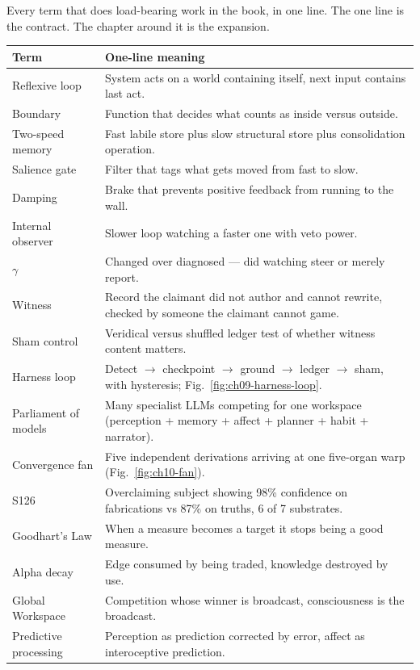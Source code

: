 Every term that does load-bearing work in the book, in one line. The one line is the contract. The chapter around it is the expansion.

\begin{center}
\small
\begin{tabular}{p{3.6cm}p{8.8cm}}
\toprule
Term & One-line meaning \\
\midrule
Reflexive loop & System acts on a world containing itself, next input contains last act. \\
Boundary & Function that decides what counts as inside versus outside. \\
Two-speed memory & Fast labile store plus slow structural store plus consolidation operation. \\
Salience gate & Filter that tags what gets moved from fast to slow. \\
Damping & Brake that prevents positive feedback from running to the wall. \\
Internal observer & Slower loop watching a faster one with veto power. \\
$\gamma$ & Changed over diagnosed --- did watching steer or merely report. \\
Witness & Record the claimant did not author and cannot rewrite, checked by someone the claimant cannot game. \\
Sham control & Veridical versus shuffled ledger test of whether witness content matters. \\
Harness loop & Detect $\to$ checkpoint $\to$ ground $\to$ ledger $\to$ sham, with hysteresis; Fig.~\ref{fig:ch09-harness-loop}. \\
Parliament of models & Many specialist LLMs competing for one workspace (perception + memory + affect + planner + habit + narrator). \\
Convergence fan & Five independent derivations arriving at one five-organ warp (Fig.~\ref{fig:ch10-fan}). \\
S126 & Overclaiming subject showing 98\% confidence on fabrications vs 87\% on truths, 6 of 7 substrates. \\
Goodhart's Law & When a measure becomes a target it stops being a good measure. \\
Alpha decay & Edge consumed by being traded, knowledge destroyed by use. \\
Global Workspace & Competition whose winner is broadcast, consciousness is the broadcast. \\
Predictive processing & Perception as prediction corrected by error, affect as interoceptive prediction. \\

\end{tabular}
\end{center}
